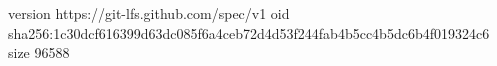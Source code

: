 version https://git-lfs.github.com/spec/v1
oid sha256:1c30dcf616399d63dc085f6a4ceb72d4d53f244fab4b5cc4b5dc6b4f019324c6
size 96588
